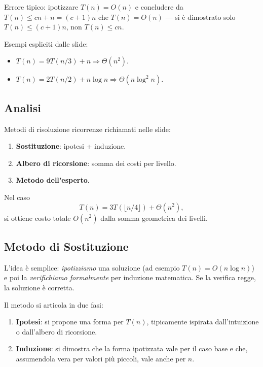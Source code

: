 \begin{hardnote}
Errore tipico: ipotizzare $T(n)=O(n)$ e concludere da $T(n)\le cn+n=(c+1)n$ che $T(n)=O(n)$ --- si è dimostrato solo $T(n)\le (c+1)n$, non $T(n)\le cn$.
\end{hardnote}

Esempi espliciti dalle slide:
\begin{itemize}
	\item $T(n)=9T(n/3)+n \Rightarrow \Theta(n^2)$.
	\item $T(n)=2T(n/2)+n\log n \Rightarrow \Theta(n\log^2 n)$.
\end{itemize}

\subsection{Analisi}
Metodi di risoluzione ricorrenze richiamati nelle slide:
\begin{enumerate}
	\item \textbf{Sostituzione}: ipotesi + induzione.
	\item \textbf{Albero di ricorsione}: somma dei costi per livello.
	\item \textbf{Metodo dell'esperto}.
\end{enumerate}

Nel caso
\[
T(n)=3T(\lfloor n/4\rfloor)+\Theta(n^2),
\]
si ottiene costo totale $O(n^2)$ dalla somma geometrica dei livelli.


\subsection{Metodo di Sostituzione}

\begin{softnote}
	L'idea è semplice: \emph{ipotizziamo} una soluzione (ad esempio $T(n) = O(n \log n)$)
	e poi la \emph{verifichiamo formalmente} per induzione matematica.
	Se la verifica regge, la soluzione è corretta.
\end{softnote}

Il metodo si articola in due fasi:
\begin{enumerate}
	\item \textbf{Ipotesi}: si propone una forma per $T(n)$, tipicamente ispirata dall'intuizione o dall'albero di ricorsione.
	\item \textbf{Induzione}: si dimostra che la forma ipotizzata vale per il caso base e che, assumendola vera per valori più piccoli, vale anche per $n$.
\end{enumerate}

